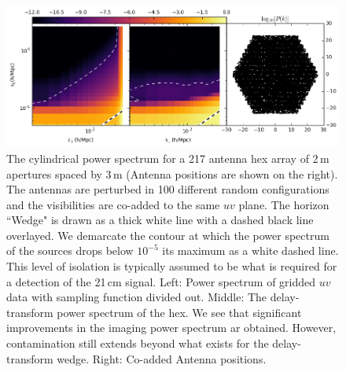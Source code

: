 \documentclass[a4paper,fleqn,usenatbib]{mnras}
\begin{document}
\begin{figure}
\includegraphics[width=\textwidth]{power_spectrum_hex_217_dAnt_2_dAntPos_3_perturbedHex_100config.png}
\caption{The cylindrical power spectrum for a 217 antenna hex array of 2\,m apertures spaced by 3\,m (Antenna positions are shown on the right). The antennas are perturbed in 100 different random configurations and the visibilities are co-added to the same $uv$ plane. The horizon ``Wedge" is drawn as a thick white line with a dashed black line overlayed. We demarcate the contour at which the power spectrum of the sources drops below $10^{-5}$ its maximum as a white dashed line. This level of isolation is typically assumed to be what is required for a detection of the 21\,cm signal. Left: Power spectrum of gridded $uv$ data with sampling function divided out. Middle: The delay-transform power spectrum of the hex. We see that significant improvements in the imaging power spectrum ar obtained. However, contamination still extends beyond what exists for the delay-transform wedge. Right: Co-added Antenna positions.}
\label{fig:PowerSpectrumPerturbedDefault_100Config}
\end{figure}



\end{document}
